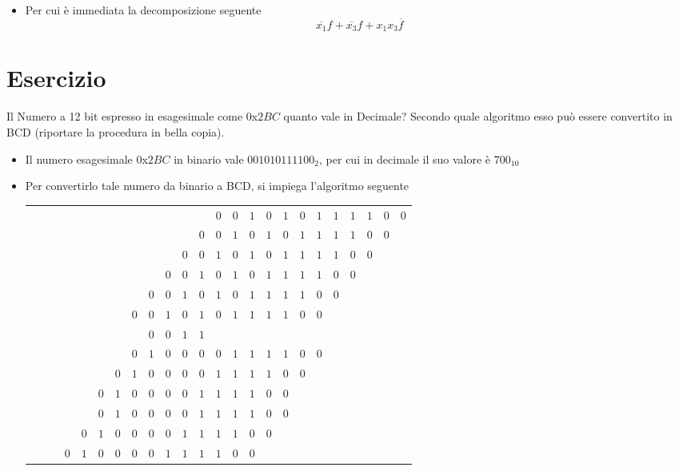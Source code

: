 \documentclass[a4paper]{extarticle}
\renewcommand\arraystretch{}
\begin{document}
\begin{itemize}
    \item Per cui è immediata la decomposizione seguente
    \[\overline{x_1} f + \overline{x_3} f + x_1x_3\overline{f}\]
\end{itemize}

\noindent
\section{Esercizio}
Il Numero a 12 bit espresso in esagesimale come $0$x$2BC$ quanto vale in Decimale? Secondo quale algoritmo esso può essere convertito in BCD (riportare la procedura in bella copia).

\begin{itemize}
    \item Il numero esagesimale $0$x$2BC$ in binario vale $0010 1011 1100_{2}$, per cui in decimale il suo valore è $700_{10}$
    \item Per convertirlo tale numero da binario a BCD, si impiega l'algoritmo seguente
    \noindent
    \begin{table}[H]
        \setlength{\tabcolsep}{4pt}
        \renewcommand{\arraystretch}{1.2}
        \centering
        \begin{tabular}{|cccc|cccc|cccc|cccccccccccc}
            &&&&&&&&&&&&$0$&$0$&$1$&$0$&$1$&$0$&$1$&$1$&$1$&$1$&$0$&$0$\\
            &&&&&&&&&&&$0$&$0$&$1$&$0$&$1$&$0$&$1$&$1$&$1$&$1$&$0$&$0$&\\
            &&&&&&&&&&$0$&$0$&$1$&$0$&$1$&$0$&$1$&$1$&$1$&$1$&$0$&$0$&&\\
            &&&&&&&&&$0$&$0$&$1$&$0$&$1$&$0$&$1$&$1$&$1$&$1$&$0$&$0$&&&\\
            &&&&&&&&$0$&$0$&$1$&$0$&$1$&$0$&$1$&$1$&$1$&$1$&$0$&$0$&&&&\\
            &&&&&&&$0$&\cellcolor{cyan!25!white}$0$&\cellcolor{cyan!25!white}$1$&\cellcolor{cyan!25!white}$0$&\cellcolor{cyan!25!white}$1$&$0$&$1$&$1$&$1$&$1$&$0$&$0$&&&&\\
            &&&&&&&&\cellcolor{cyan!25!white}$0$\cellcolor{cyan!25!white}&\cellcolor{cyan!25!white}$0$&\cellcolor{cyan!25!white}$1$&\cellcolor{cyan!25!white}$1$&&&&&&&&&&&&\\
    
            &&&&&&&$0$&$1$&$0$&$0$&$0$&$0$&$1$&$1$&$1$&$1$&$0$&$0$&&&&&\\
            &&&&&&$0$&$1$&$0$&$0$&$0$&$0$&$1$&$1$&$1$&$1$&$0$&$0$&&&&&&\\
            &&&&&$0$&$1$&$0$&$0$&$0$&$0$&$1$&$1$&$1$&$1$&$0$&$0$&&&&&&&\\
            &&&&&$0$&$1$&$0$&$0$&$0$&$0$&$1$&$1$&$1$&$1$&$0$&$0$&&&&&&&\\
            &&&&$0$&$1$&$0$&$0$&$0$&$0$&$1$&$1$&$1$&$1$&$0$&$0$&&&&&&&&\\
            &&&$0$&\cellcolor{cyan!25!white}$1$&\cellcolor{cyan!25!white}$0$&\cellcolor{cyan!25!white}$0$&\cellcolor{cyan!25!white}$0$&\cellcolor{cyan!25!white}$0$&\cellcolor{cyan!25!white}$1$&\cellcolor{cyan!25!white}$1$&\cellcolor{cyan!25!white}$1$&$1$&$0$&$0$&&&&&&&&&\\
    

\end{tabular}
\end{table}
\end{itemize}
\end{document}
